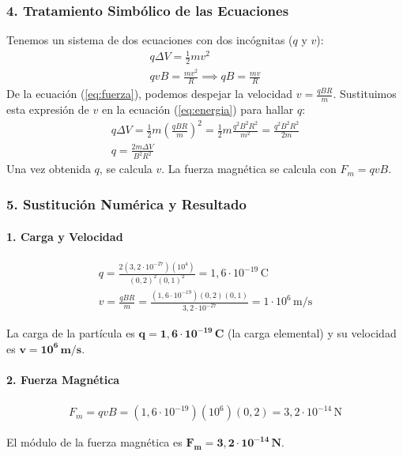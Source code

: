 \subsubsection*{4. Tratamiento Simbólico de las Ecuaciones}
Tenemos un sistema de dos ecuaciones con dos incógnitas ($q$ y $v$):
\begin{gather}
    q \Delta V = \frac{1}{2} m v^2 \label{eq:energia} \\
    qvB = \frac{mv^2}{R} \implies qB = \frac{mv}{R} \label{eq:fuerza}
\end{gather}
De la ecuación (\ref{eq:fuerza}), podemos despejar la velocidad $v = \frac{qBR}{m}$.
Sustituimos esta expresión de $v$ en la ecuación (\ref{eq:energia}) para hallar $q$:
\begin{gather}
    q \Delta V = \frac{1}{2} m \left(\frac{qBR}{m}\right)^2 = \frac{1}{2} m \frac{q^2 B^2 R^2}{m^2} = \frac{q^2 B^2 R^2}{2m} \nonumber \\[8pt]
    q = \frac{2m \Delta V}{B^2 R^2}
\end{gather}
Una vez obtenida $q$, se calcula $v$. La fuerza magnética se calcula con $F_m = qvB$.

\subsubsection*{5. Sustitución Numérica y Resultado}
\paragraph*{1. Carga y Velocidad}
\begin{gather}
    q = \frac{2 (3,2\cdot10^{-27}) (10^4)}{(0,2)^2 (0,1)^2} = 1,6 \cdot 10^{-19} \, \text{C} \\
    v = \frac{qBR}{m} = \frac{(1,6 \cdot 10^{-19})(0,2)(0,1)}{3,2\cdot10^{-27}} = 1 \cdot 10^6 \, \text{m/s}
\end{gather}
\begin{cajaresultado}
    La carga de la partícula es $\boldsymbol{q = 1,6 \cdot 10^{-19} \, C}$ (la carga elemental) y su velocidad es $\boldsymbol{v = 10^6 \, m/s}$.
\end{cajaresultado}

\paragraph*{2. Fuerza Magnética}
\begin{gather}
    F_m = qvB = (1,6 \cdot 10^{-19})(10^6)(0,2) = 3,2 \cdot 10^{-14} \, \text{N}
\end{gather}
\begin{cajaresultado}
    El módulo de la fuerza magnética es $\boldsymbol{F_m = 3,2 \cdot 10^{-14} \, N}$.
\end{cajaresultado}

